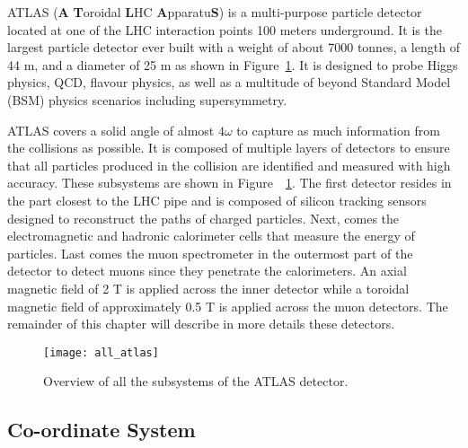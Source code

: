 ATLAS (\textbf{A} \textbf{T}oroidal \textbf{L}HC \textbf{A}pparatu\textbf{S}) is a 
multi-purpose particle detector located at one of the 
LHC interaction points 100 meters underground. 
It is the largest particle detector ever built with a weight of about 7000 tonnes, a length of 44 m, 
and a diameter of 25 m as shown in Figure~\ref{fig:exp.atlas.atlas}.
It is designed to probe Higgs physics, QCD, flavour physics, as well as a multitude of beyond Standard Model (BSM) physics scenarios including supersymmetry.

ATLAS covers a solid angle of almost $4\omega$ to capture as much information from the collisions 
as possible. 
It is composed of multiple layers of detectors to ensure that all particles produced in the 
collision are identified and measured with high accuracy.
These subsystems are shown in Figure~~\ref{fig:exp.atlas.atlas}.
The first detector resides in the part closest to the
LHC pipe and is composed of silicon tracking sensors designed to reconstruct the paths
of charged particles. 
Next, comes the electromagnetic and hadronic calorimeter cells that 
measure the energy of particles. Last comes the muon spectrometer in the outermost part of the 
detector to detect muons since they penetrate the calorimeters. 
An axial magnetic field of 2 T is applied across the inner detector while a toroidal magnetic field 
of approximately 0.5 T is applied across the muon detectors.
The remainder of this chapter will describe in more details these detectors.




\begin{figure}[t!]
\centering
\texttt{[image: all\_atlas]}
\caption{Overview of all the subsystems of the ATLAS detector.}%
\label{fig:exp.atlas.atlas}
\end{figure} 




\subsection{Co-ordinate System}

